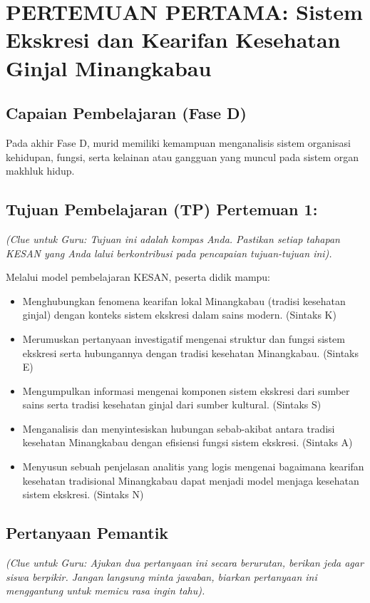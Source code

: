\documentclass[a4paper,12pt]{article}
\begin{document}
\section{PERTEMUAN PERTAMA: Sistem Ekskresi dan Kearifan Kesehatan Ginjal Minangkabau}

\subsection{Capaian Pembelajaran (Fase D)}
Pada akhir Fase D, murid memiliki kemampuan menganalisis sistem organisasi kehidupan, fungsi, serta kelainan atau gangguan yang muncul pada sistem organ makhluk hidup.

\subsection{Tujuan Pembelajaran (TP) Pertemuan 1:}
\textit{(Clue untuk Guru: Tujuan ini adalah kompas Anda. Pastikan setiap tahapan KESAN yang Anda lalui berkontribusi pada pencapaian tujuan-tujuan ini).}

Melalui model pembelajaran KESAN, peserta didik mampu:
\begin{itemize}
\item Menghubungkan fenomena kearifan lokal Minangkabau (tradisi kesehatan ginjal) dengan konteks sistem ekskresi dalam sains modern. (Sintaks K)
\item Merumuskan pertanyaan investigatif mengenai struktur dan fungsi sistem ekskresi serta hubungannya dengan tradisi kesehatan Minangkabau. (Sintaks E)
\item Mengumpulkan informasi mengenai komponen sistem ekskresi dari sumber sains serta tradisi kesehatan ginjal dari sumber kultural. (Sintaks S)
\item Menganalisis dan menyintesiskan hubungan sebab-akibat antara tradisi kesehatan Minangkabau dengan efisiensi fungsi sistem ekskresi. (Sintaks A)
\item Menyusun sebuah penjelasan analitis yang logis mengenai bagaimana kearifan kesehatan tradisional Minangkabau dapat menjadi model menjaga kesehatan sistem ekskresi. (Sintaks N)
\end{itemize}

\subsection{Pertanyaan Pemantik}
\textit{(Clue untuk Guru: Ajukan dua pertanyaan ini secara berurutan, berikan jeda agar siswa berpikir. Jangan langsung minta jawaban, biarkan pertanyaan ini menggantung untuk memicu rasa ingin tahu).}
\end{document}
